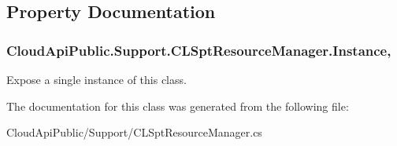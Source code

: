 \subsection{Property Documentation}
\hypertarget{class_cloud_api_public_1_1_support_1_1_c_l_spt_resource_manager_a45c4cfa4a9690616ce783b9924731b4f}{
\subsubsection[{Instance}]{ Cloud\-Api\-Public.\-Support.\-C\-L\-Spt\-Resource\-Manager.\-Instance\hspace{0.3cm}{\ttfamily [static]}, {\ttfamily [get]}}}\label{class_cloud_api_public_1_1_support_1_1_c_l_spt_resource_manager_a45c4cfa4a9690616ce783b9924731b4f}


Expose a single instance of this class. 



The documentation for this class was generated from the following file\-:\begin{DoxyCompactItemize}
\item 
Cloud\-Api\-Public/\-Support/C\-L\-Spt\-Resource\-Manager.\-cs\end{DoxyCompactItemize}
